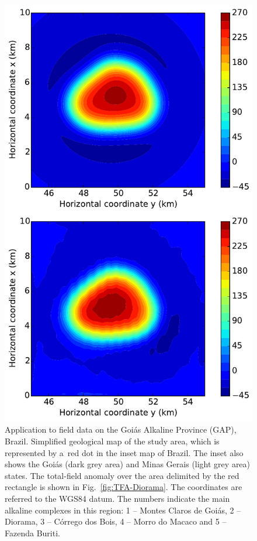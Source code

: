 \documentclass[journal abbreviation, npg]{copernicus}
\begin{document}
\begin{figure}[t]
\includegraphics[width=120mm]{Figures/npgd-2014-0069-f13}
\caption{Application to field data on the Goi\'{a}s Alkaline Province
  (GAP), Brazil. Simplified geological map of the study area, which is
  represented by a~red dot in the inset map of Brazil. The inset also
  shows the Goi\'{a}s (dark grey area) and Minas Gerais (light grey
  area) states. The total-field anomaly over the area delimited by the
  red rectangle is shown in Fig.~\ref{fig:TFA-Diorama}. The
  coordinates are referred to the WGS84 datum. The numbers indicate
  the main alkaline complexes in this region: 1 -- Montes Claros de
  Goi\'{a}s, 2 -- Diorama, 3 -- C\'{o}rrego dos Bois, 4 -- Morro do
  Macaco and 5 -- Fazenda Buriti. }
\label{fig:geology-study-area}
\end{figure}
\end{document}
